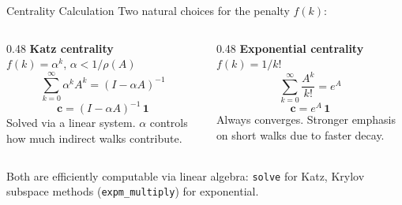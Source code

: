 \documentclass[aspectratio=169]{beamer}
\begin{document}
\begin{frame}{Centrality Calculation}
    Two natural choices for the penalty $f(k)$:

    \bigskip
    \begin{columns}[T]
        \begin{column}{0.48\textwidth}
            \textbf{Katz centrality}\\[0.4em]
            $f(k) = \alpha^k$, \quad $\alpha < 1/\rho(A)$
            \[
                \sum_{k=0}^{\infty} \alpha^k A^k = (I - \alpha A)^{-1}
            \]
            \[
                \mathbf{c} = (I - \alpha A)^{-1}\,\mathbf{1}
            \]
            Solved via a linear system. $\alpha$ controls how much indirect walks contribute.
        \end{column}
        \begin{column}{0.48\textwidth}
            \textbf{Exponential centrality}\\[0.4em]
            $f(k) = 1/k!$
            \[
                \sum_{k=0}^{\infty} \frac{A^k}{k!} = e^A
            \]
            \[
                \mathbf{c} = e^A\,\mathbf{1}
            \]
            Always converges. Stronger emphasis on short walks due to faster decay.
        \end{column}
    \end{columns}

    \bigskip
    Both are efficiently computable via linear algebra: \texttt{solve} for Katz,
    Krylov subspace methods (\texttt{expm\_multiply}) for exponential.
\end{frame}
\end{document}
